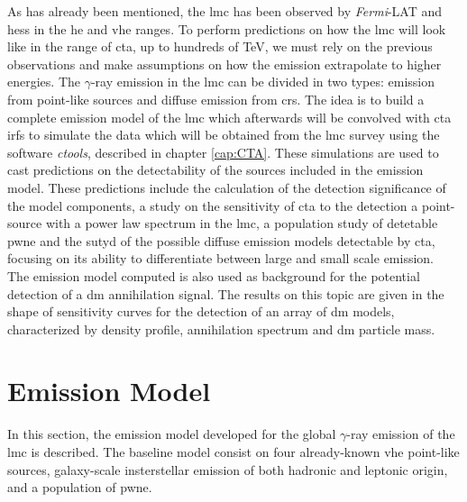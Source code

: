 \documentclass[main.tex]{subfiles}
\begin{document}
As has already been mentioned, the \gls{lmc} has been observed by \textit{Fermi}-LAT and \gls{hess} in the \gls{he} and \gls{vhe} ranges. To perform predictions on how the \gls{lmc} will look like in the range of \gls{cta}, up to hundreds of TeV, we must rely on the previous observations and make assumptions on how the emission extrapolate to higher energies. The $\gamma$-ray emission in the \gls{lmc} can be divided in two types: emission from point-like sources and diffuse emission from \glspl{cr}. The idea is to build a complete emission model of the \gls{lmc} which afterwards will be convolved with \gls{cta} \glspl{irf} to simulate the data which will be obtained from the \gls{lmc} survey using the software \textit{ctools}, described in chapter \ref{cap:CTA}. These simulations are used to cast predictions on the detectability of the sources included in the emission model. These predictions include the calculation of the detection significance of the model components, a study on the sensitivity of \gls{cta} to the detection a point-source with a power law spectrum in the \gls{lmc}, a population study of detetable \gls{pwne} and the sutyd of the possible diffuse emission models detectable by \gls{cta}, focusing on its ability to differentiate between large and small scale emission.\\
The emission model computed is also used as background for the potential detection of a \gls{dm} annihilation signal. The results on this topic are given in the shape of sensitivity curves for the detection of an array of \gls{dm} models, characterized by density profile, annihilation spectrum and \gls{dm} particle mass.

\section{Emission Model} \label{sec:model}

In this section, the emission model developed for the global $\gamma$-ray emission of the \gls{lmc} is described. The baseline model consist on four already-known \gls{vhe} point-like sources, galaxy-scale insterstellar emission of both hadronic and leptonic origin, and a population of \gls{pwne}. 
\end{document}

